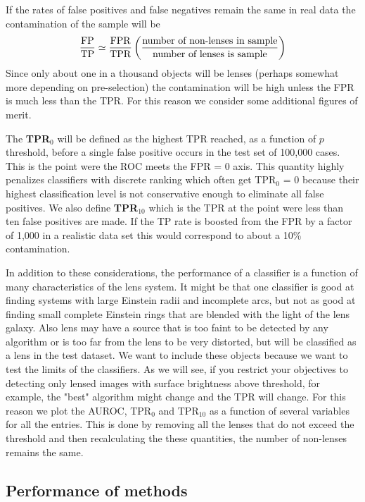 \documentclass[useAMS,usenatbib]{mnras}
\begin{document}
If the rates of false positives and false negatives remain the same in real data  the contamination of the sample will be
\begin{align}
\frac{\rm FP}{\rm TP} \simeq \frac{\rm FPR}{\rm TPR} \left(\frac{\textrm{number of non-lenses in sample}}{\textrm{number of lenses is sample}} \right)
\end{align}
Since only about one in a thousand objects will be lenses (perhaps somewhat more depending on pre-selection) the contamination will be high unless the FPR is much less than the TPR.  For this reason we consider some additional figures of merit.

The {\bf TPR$_0$} will be defined as the highest TPR reached, as a function of $p$ threshold, before a single false positive occurs in the test set of 100,000 cases.  This is the point were the ROC meets the FPR = 0 axis.  This quantity highly penalizes classifiers with discrete ranking which often get TPR$_0$ = 0 because their highest classification level is not conservative enough to eliminate all false positives.  We also define {\bf TPR$_{10}$} which is the TPR at the point were less than ten false positives are made.  If the TP rate is boosted from the FPR by a factor of 1,000 in a realistic data set this would correspond to about a 10\% contamination.

In addition to these considerations, the performance of a classifier is a function of many characteristics of the lens system.  It might be that one classifier is good at finding systems with large Einstein radii and incomplete arcs, but not as good at finding small complete Einstein rings that are blended with the light of the lens galaxy.  Also lens may have a source that is too faint to be detected by any algorithm or is too far from the lens to be very distorted, but will be classified as a lens in the test dataset.   We want to include these objects because we want to test the limits of the classifiers.  As we will see, if you restrict your objectives to detecting only lensed images with surface brightness above threshold, for example, the "best" algorithm might change and the TPR will change.  For this reason we plot the AUROC, TPR$_0$ and TPR$_{10}$ as a function of several variables for all the entries.  This is done by removing all the lenses that do not exceed the threshold and then recalculating the these quantities, the number of non-lenses remains the same.

\subsection{Performance of methods}
\label{sec:performance}
\end{document}
